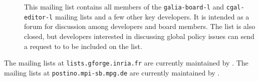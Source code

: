 \begin{description}
\item[] 
     This mailing list contains all members of the \texttt{galia-board-l} and
     \texttt{cgal-editor-l} mailing lists and a few other key developers.
     It is intended as a forum for discussion among developers and board 
     members.  The list is also closed, but developers interested in 
     discussing global policy issues can send a request to 
      to be included
     on the list.
\end{description}

The mailing lists at \texttt{lists.gforge.inria.fr} are currently maintained by
.
The mailing lists at \texttt{postino.mpi-sb.mpg.de} 
are currently
maintained by . 
